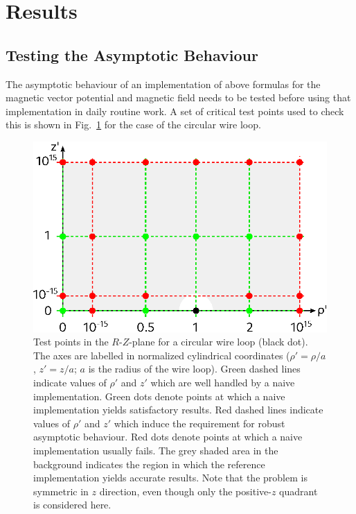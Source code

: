 \section{Results}
\label{sec:results}

\subsection{Testing the Asymptotic Behaviour}

The asymptotic behaviour of an implementation of above formulas for the magnetic vector potential
and magnetic field needs to be tested before using that implementation in daily routine work.
A set of critical test points used to check this is shown in Fig.~\ref{fig:circularLoop_criticalPoints}
for the case of the circular wire loop.
\begin{figure}[htbp]
 \centering
 \includegraphics{img/circularLoop_criticalPoints.eps}
 \caption{Test points in the $R$-$Z$-plane for a circular wire loop (black dot).
          The axes are labelled in normalized cylindrical coordinates ($\rho' = \rho / a$, $z' = z / a$; $a$ is the radius of the wire loop).
          Green dashed lines indicate values of $\rho'$ and $z'$ which are well handled by a naive implementation.
          Green dots denote points at which a naive implementation yields satisfactory results.
          Red dashed lines indicate values of $\rho'$ and $z'$ which induce the requirement for robust asymptotic behaviour.
          Red dots denote points at which a naive implementation usually fails.
          The grey shaded area in the background indicates the region in which the reference implementation yields accurate results.
          Note that the problem is symmetric in $z$ direction, even though only the positive-$z$ quadrant is considered here.}
 \label{fig:circularLoop_criticalPoints}
\end{figure}

